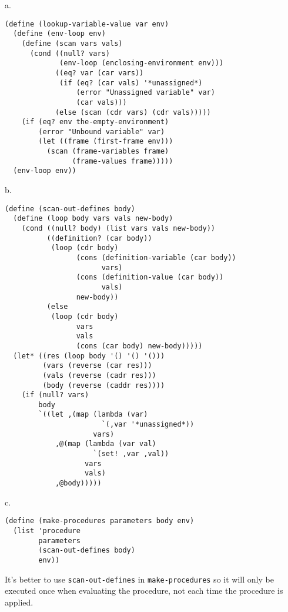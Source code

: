\documentclass[a4paper,12pt]{article}
\newcommand{\subpar}[1]{\medskip \noindent #1.}
\begin{document}
\subpar{a}
\begin{lstlisting}
(define (lookup-variable-value var env)
  (define (env-loop env)
    (define (scan vars vals)
      (cond ((null? vars)
             (env-loop (enclosing-environment env)))
            ((eq? var (car vars))
             (if (eq? (car vals) '*unassigned*)
                 (error "Unassigned variable" var)
                 (car vals)))
            (else (scan (cdr vars) (cdr vals)))))
    (if (eq? env the-empty-environment)
        (error "Unbound variable" var)
        (let ((frame (first-frame env)))
          (scan (frame-variables frame)
                (frame-values frame)))))
  (env-loop env))
\end{lstlisting}

\subpar{b}
\begin{lstlisting}
(define (scan-out-defines body)
  (define (loop body vars vals new-body)
    (cond ((null? body) (list vars vals new-body))
          ((definition? (car body))
           (loop (cdr body)
                 (cons (definition-variable (car body))
                       vars)
                 (cons (definition-value (car body))
                       vals)
                 new-body))
          (else
           (loop (cdr body)
                 vars
                 vals
                 (cons (car body) new-body)))))
  (let* ((res (loop body '() '() '()))
         (vars (reverse (car res)))
         (vals (reverse (cadr res)))
         (body (reverse (caddr res))))
    (if (null? vars)
        body
        `((let ,(map (lambda (var)
                       `(,var '*unassigned*))
                     vars)
            ,@(map (lambda (var val)
                     `(set! ,var ,val))
                   vars
                   vals)
            ,@body)))))
\end{lstlisting}

\subpar{c}

\begin{lstlisting}
(define (make-procedures parameters body env)
  (list 'procedure
        parameters
        (scan-out-defines body)
        env))
\end{lstlisting}

It's better to use \lstinline!scan-out-defines! in
\lstinline!make-procedures! so it will only be executed once when
evaluating the procedure, not each time the procedure is applied.
\end{document}
